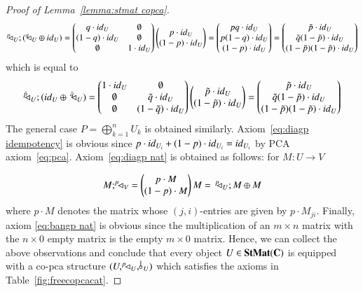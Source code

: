 \begin{proof}[Proof of Lemma~\ref{lemma:stmat copca}]
\[ ^p\!\! \lhd_{U};(^q\!\! \lhd_{U}\oplus {id}_{U}) = \begin{pmatrix}
    q\cdot {id}_{U} &  \emptyset \\
    (1-q)\cdot {id}_{U} &  \emptyset\\
    \emptyset & 1\cdot {id}_{U}
\end{pmatrix}
\begin{pmatrix}
    p\cdot {id}_{U} \\
    (1-p)\cdot {id}_{U}
\end{pmatrix}= \begin{pmatrix}
    pq\cdot {id}_{U} \\
    p(1-q)\cdot {id}_{U} \\
    (1-p)\cdot {id}_{U}
\end{pmatrix} = \begin{pmatrix}
    \tilde{p}\cdot {id}_{U} \\
    \tilde{q}(1-\tilde{p})\cdot {id}_{U} \\
    (1-\tilde{p})(1-\tilde{p})\cdot {id}_{U}
    \end{pmatrix} \]
which is equal to
\[ ^{\tilde{p}}\!\! \lhd_{U};({id}_{U}\oplus\, ^{\tilde{q}}\!\! \lhd_{U}) = \begin{pmatrix}
    1\cdot {id}_{U} &  \emptyset\\
    \emptyset & \tilde{q}\cdot {id}_{U} \\
    \emptyset & (1-\tilde{q})\cdot {id}_{U}
\end{pmatrix}
\begin{pmatrix}
    \tilde{p}\cdot {id}_{U} \\
    (1-\tilde{p})\cdot {id}_{U}
\end{pmatrix}= \begin{pmatrix}
    \tilde{p}\cdot {id}_{U} \\
    \tilde{q}(1-\tilde{p})\cdot {id}_{U} \\
    (1-\tilde{p})(1-\tilde{p})\cdot {id}_{U}
\end{pmatrix} \]
The general case $P=\bigoplus_{k=1}^{n} U_k$ is obtained similarly. Axiom~\ref{eq:diagp idempotency} is obvious since $p\cdot {id}_{U_i}+ (1-p)\cdot {id}_{U_i}= {id}_{U_i}$ by PCA axiom~\ref{eq:pca}. 
Axiom~\ref{eq:diagp nat} is obtained as follows: for $M\colon U\to V$

\[M;^p\!\! \lhd_{V} = \begin{pmatrix}
    p\cdot M\\
    (1-p)\cdot M
\end{pmatrix} 
M=\, ^p\!\! \lhd_{U};M\oplus M\]
where $p\cdot M$ denotes the matrix whose $(j,i)$-entries are given by $p\cdot M_{ji}$. 
Finally, axiom \ref{eq:bangp nat} is obvious since the multiplication of an $m\times n$ matrix with the $n\times 0$ empty matrix is the empty $m\times 0$ matrix. Hence, we can collect the above observations and conclude that every object $U\in\mathbf{StMat}(\mathbf{C})$ is equipped with a co-pca structure $(U,\diagp{U},\bangp{U})$ which satisfies the axioms in Table~\ref{fig:freecopcacat}.
    \end{proof}


